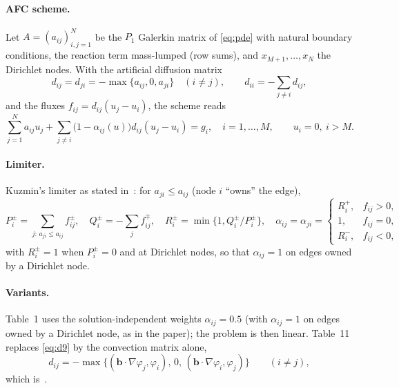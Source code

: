 \documentclass[11pt]{article}
\newcommand{\bb}{\boldsymbol{b}}
\newcommand{\R}{\mathbb{R}}
\begin{document}
\paragraph{AFC scheme.} Let $A=(a_{ij})_{i,j=1}^N$ be the $P_1$ Galerkin matrix of \eqref{eq:pde} with natural
boundary conditions, the reaction term mass-lumped (row sums), and $x_{M+1},\dots,x_N$ the Dirichlet nodes. With the
artificial diffusion matrix
\begin{equation}\label{eq:d9}
  d_{ij}=d_{ji}=-\max\{a_{ij},0,a_{ji}\}\quad(i\neq j),\qquad d_{ii}=-\textstyle\sum_{j\neq i}d_{ij},
\end{equation}
and the fluxes $f_{ij}=d_{ij}(u_j-u_i)$, the scheme reads~\cite[(11)]{BJK16}
\begin{equation}\label{eq:afc}
  \sum_{j=1}^N a_{ij}u_j+\sum_{j\neq i}\bigl(1-\alpha_{ij}(u)\bigr)d_{ij}(u_j-u_i)=g_i,\quad i=1,\dots,M,
  \qquad u_i=0,\ i>M .
\end{equation}

\paragraph{Limiter.} Kuzmin's limiter as stated in~\cite[Sect.~4]{BJK16}: for $a_{ji}\le a_{ij}$ (node $i$
``owns'' the edge),
\[
  P_i^\pm=\sum_{j:\,a_{ji}\le a_{ij}}f_{ij}^\pm,\quad Q_i^\pm=-\sum_{j}f_{ij}^\mp,\quad
  R_i^\pm=\min\{1,Q_i^\pm/P_i^\pm\},\quad
  \alpha_{ij}=\alpha_{ji}=\begin{cases}R_i^+,&f_{ij}>0,\\1,&f_{ij}=0,\\R_i^-,&f_{ij}<0,\end{cases}
\]
with $R_i^\pm=1$ when $P_i^\pm=0$ and at Dirichlet nodes, so that $\alpha_{ij}=1$ on edges owned by a Dirichlet node.

\paragraph{Variants.} Table~1 uses the solution-independent weights $\alpha_{ij}=0.5$ (with $\alpha_{ij}=1$ on edges
owned by a Dirichlet node, as in the paper); the problem is then linear. Table~11 replaces \eqref{eq:d9} by the
convection matrix alone,
\begin{equation}\label{eq:d54}
  d_{ij}=-\max\{(\bb\cdot\nabla\varphi_j,\varphi_i),\,0,\,(\bb\cdot\nabla\varphi_i,\varphi_j)\}\qquad(i\neq j),
\end{equation}
which is~\cite[(54)]{BJK16}.
\end{document}

